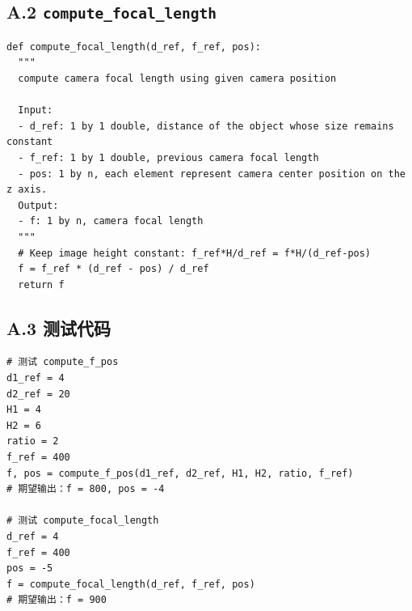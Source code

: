 \documentclass[12pt,a4paper]{ctexart}
\begin{document}
\subsection*{A.2 \texttt{compute\_focal\_length}}

\begin{lstlisting}
def compute_focal_length(d_ref, f_ref, pos):
  """
  compute camera focal length using given camera position

  Input:
  - d_ref: 1 by 1 double, distance of the object whose size remains constant
  - f_ref: 1 by 1 double, previous camera focal length
  - pos: 1 by n, each element represent camera center position on the z axis.
  Output:
  - f: 1 by n, camera focal length
  """
  # Keep image height constant: f_ref*H/d_ref = f*H/(d_ref-pos)
  f = f_ref * (d_ref - pos) / d_ref
  return f
\end{lstlisting}

\subsection*{A.3 测试代码}

\begin{lstlisting}
# 测试 compute_f_pos
d1_ref = 4
d2_ref = 20
H1 = 4
H2 = 6
ratio = 2
f_ref = 400
f, pos = compute_f_pos(d1_ref, d2_ref, H1, H2, ratio, f_ref)
# 期望输出：f = 800, pos = -4

# 测试 compute_focal_length
d_ref = 4
f_ref = 400
pos = -5
f = compute_focal_length(d_ref, f_ref, pos)
# 期望输出：f = 900
\end{lstlisting}
\end{document}
